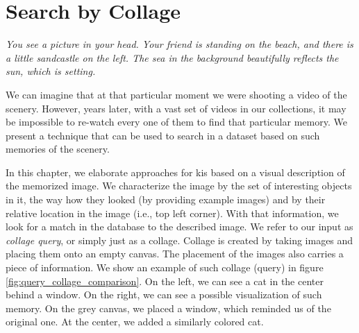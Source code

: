 
\chapter{Search by Collage}
\label{ch:object_location}


\normalem
\emph{You see a picture in your head. Your friend is standing on the beach, and there is a little sandcastle on the left. The sea in the background beautifully reflects the sun, which is setting.}
\ULforem

We can imagine that at that particular moment we were shooting a video of the scenery. However, years later, with a vast set of videos in our collections, it may be impossible to re-watch every one of them to find that particular memory. We present a technique that can be used to search in a dataset based on such memories of the scenery.

In this chapter, we elaborate approaches for \acrlong{kis} based on a visual description of the memorized image. We characterize the image by the set of interesting objects in it, the way how they looked (by providing example images) and by their relative location in the image (i.e., top left corner). With that information, we look for a match in the database to the described image. We refer to our input as \emph{collage query}, or simply just as a collage. Collage is created by taking images and placing them onto an empty canvas. The placement of the images also carries a piece of information. We show an example of such collage (query) in figure \ref{fig:query_collage_comparison}. On the left, we can see a cat in the center behind a window. On the right, we can see a possible visualization of such memory. On the grey canvas, we placed a window, which reminded us of the original one. At the center, we added a similarly colored cat.

